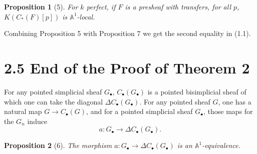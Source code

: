 \documentclass[11pt]{article}
\newcommand{\Aone}{\mathbb A^1}
\theoremstyle{deligne}
\newtheorem*{proposition*}{Proposition}
\begin{document}
\begin{proposition*}[5]
For \(k\) perfect, if \(F\) is a presheaf with transfers, for all \(p\), \(K(C_*(F)[p])\) is \(\Aone\)-local.
\end{proposition*}

Combining Proposition 5 with Proposition 7 we get the second equality in (1.1).

\section*{2.5 End of the Proof of Theorem 2}

For any pointed simplicial sheaf \(G_\bullet\), \(C_\bullet(G_\bullet)\) is a pointed bisimplicial sheaf of which one can take the diagonal \(\Delta C_\bullet(G_\bullet)\). For any pointed sheaf \(G\), one has a natural map \(G\to C_\bullet(G)\), and for a pointed simplicial sheaf \(G_\bullet\), those maps for the \(G_n\) induce
\[
a:G_\bullet\longrightarrow \Delta C_\bullet(G_\bullet).
\]

\begin{proposition*}[6]
The morphism \(a:G_\bullet\to\Delta C_\bullet(G_\bullet)\) is an \(\Aone\)-equivalence.
\end{proposition*}
\end{document}

